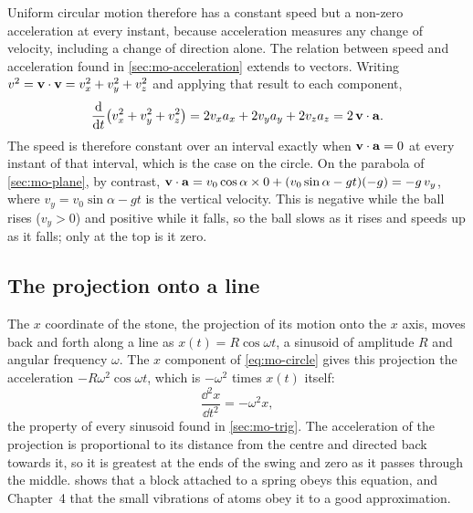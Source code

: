 Uniform circular motion therefore has a constant speed but a non-zero
acceleration at every instant, because acceleration measures any change of
velocity, including a change of direction alone. The relation between
speed and acceleration found in \cref{sec:mo-acceleration} extends to
vectors. Writing $v^2 = \bm{\mathrm{v}}\cdot\bm{\mathrm{v}} = v_x^2 + v_y^2 + v_z^2$ and
applying that result to each component,
\begin{equation*}
   \frac{\mathrm{d}}{\mathrm{d} t}\bigl(v_x^2 + v_y^2 + v_z^2\bigr)
   = 2v_x a_x + 2v_y a_y + 2v_z a_z = 2\,\bm{\mathrm{v}}\cdot\bm{\mathrm{a}} .
\end{equation*}
The speed is therefore constant over an interval exactly when
$\bm{\mathrm{v}}\cdot\bm{\mathrm{a}} = 0$ at every instant of that interval, which is the
case on the circle. On the parabola of \cref{sec:mo-plane}, by contrast,
$\bm{\mathrm{v}}\cdot\bm{\mathrm{a}} = v_0\cos\alpha\times0 + (v_0\sin\alpha - gt)(-g) =
-g\,v_y$, where $v_y = v_0\sin\alpha - gt$ is the vertical velocity. This
is negative while the ball rises ($v_y > 0$) and positive while it falls,
so the ball slows as it rises and speeds up as it falls; only at the top
is it zero.

\subsection*{The projection onto a line}

The $x$ coordinate of the stone, the projection of its motion onto the $x$
axis, moves back and forth along a line as $x(t) = R\cos\omega t$, a
sinusoid of amplitude $R$ and angular frequency $\omega$. The $x$
component of \cref{eq:mo-circle} gives this projection the acceleration
$-R\omega^2\cos\omega t$, which is $-\omega^2$ times $x(t)$ itself:
\begin{equation*}
   \frac{\dd^2 x}{\dd t^2} = -\omega^2 x ,
\end{equation*}
the property of every sinusoid found in \cref{sec:mo-trig}. The
acceleration of the projection is proportional to its distance from the
centre and directed back towards it, so it is greatest at the ends of the
swing and zero as it passes through the middle. 
shows that a block attached to a spring obeys this equation, and
Chapter~4 that the small vibrations of atoms obey it to a good
approximation.

